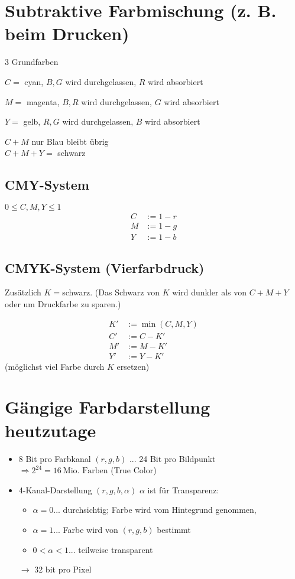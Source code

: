 \section{Subtraktive Farbmischung (z. B. beim Drucken)}
3 Grundfarben
\begin{description}
 \item $C = $ cyan, $B, G$ wird durchgelassen, $R$ wird absorbiert
 \item $M = $ magenta, $B, R$ wird durchgelassen, $G$ wird absorbiert
 \item $Y = $ gelb, $R, G$ wird durchgelassen, $B$ wird absorbiert
\end{description}
$C + M$ nur Blau bleibt übrig\\
$C + M + Y = $ schwarz

\subsection{CMY-System}
$0 \le C, M, Y \le 1$
\begin{align*}
 C &:= 1 - r\\
 M &:= 1 - g\\
 Y &:= 1 - b
\end{align*}

\subsection{CMYK-System (Vierfarbdruck)}
Zusätzlich $K = $schwarz. (Das Schwarz von $K$ wird dunkler als von $C + M + Y$ oder um Druckfarbe zu sparen.)
\begin{center}
\end{center}
\begin{align*}
 K' &:= \min(C, M, Y)\\
 C' &:= C - K'\\
 M' &:= M - K'\\
 Y' &:= Y - K'
\end{align*}
(möglichst viel Farbe durch $K$ ersetzen)

\section{Gängige Farbdarstellung heutzutage}
\begin{itemize}
 \item 8 Bit pro Farbkanal $(r,g,b)$ ... 24 Bit pro Bildpunkt\\
	$\Rightarrow 2^{24} = 16\ \text{Mio. Farben}$ (True Color)
 \item 4-Kanal-Darstellung $(r, g, b, \alpha)$
	$\alpha$ ist für Transparenz:
	\begin{itemize}
	 \item $\alpha = 0...$ durchsichtig; Farbe wird vom Hintegrund genommen,
	 \item $\alpha = 1...$ Farbe wird von $(r, g, b)$ bestimmt
	 \item $0 < \alpha < 1...$ teilweise transparent
	\end{itemize}
	$\rightarrow$ 32 bit pro Pixel
\end{itemize}
